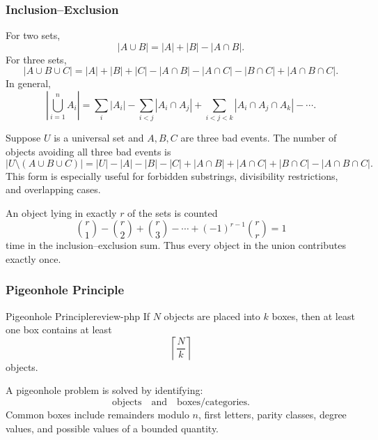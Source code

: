 \subsubsection{Inclusion--Exclusion}

\begin{keyformula}[title={Inclusion--exclusion}]
For two sets,
\[
|A\cup B|=|A|+|B|-|A\cap B|.
\]
For three sets,
\[
|A\cup B\cup C|
=
|A|+|B|+|C|
-|A\cap B|-|A\cap C|-|B\cap C|
+|A\cap B\cap C|.
\]
In general,
\[
\left|\bigcup_{i=1}^{n}A_i\right|
=
\sum_i |A_i|
-
\sum_{i<j}|A_i\cap A_j|
+
\sum_{i<j<k}|A_i\cap A_j\cap A_k|
-\cdots .
\]
\end{keyformula}

\begin{examplebox}[title={Counting objects avoiding forbidden conditions}]
Suppose \(U\) is a universal set and \(A,B,C\) are three bad events. The number of objects avoiding all three bad events is
\[
|U\setminus(A\cup B\cup C)|
=
|U|-|A|-|B|-|C|
+|A\cap B|+|A\cap C|+|B\cap C|
-|A\cap B\cap C|.
\]
This form is especially useful for forbidden substrings, divisibility restrictions, and overlapping cases.
\end{examplebox}

\begin{extension}[title={Why the signs alternate}]
An object lying in exactly \(r\) of the sets is counted
\[
\binom{r}{1}-\binom{r}{2}+\binom{r}{3}-\cdots+(-1)^{r-1}\binom{r}{r}=1
\]
time in the inclusion--exclusion sum. Thus every object in the union contributes exactly once.
\end{extension}

\subsubsection{Pigeonhole Principle}

\begin{theorem}{Pigeonhole Principle}{review-php}
If \(N\) objects are placed into \(k\) boxes, then at least one box contains at least
\[
\left\lceil \frac{N}{k}\right\rceil
\]
objects.
\end{theorem}

\begin{examtip}[title={Pigeonhole modelling}]
A pigeonhole problem is solved by identifying:
\[
\text{objects}
\quad\text{and}\quad
\text{boxes/categories}.
\]
Common boxes include remainders modulo \(n\), first letters, parity classes, degree values, and possible values of a bounded quantity.
\end{examtip}

